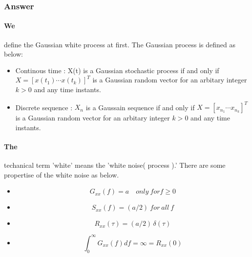 \documentclass[12pt,a4paper]{article}
\begin{document}
	\subsubsection{Answer}
	\paragraph{We} define the Gaussian white process at first. The Gaussian process is defined as below:\\
	\begin{itemize}
		\item Continous time : X(t) is a Gaussian stochastic process if and only if $X=[x(t_{1})\cdots x(t_{k})]^{T}$ is a Gaussian random vector for an arbitary integer $k>0$ and any time instants.
		\item Discrete sequence : $X_{n}$ is a Gaussain sequence if and only if $X=[x_{n_{1}}\cdots x_{n_{k}}]^{T}$ is a Gaussian random vector for an arbitary integer $k>0$ and any time instants.
	\end{itemize}\cite{Book2}
	\paragraph{The}techanical term 'white' means the 'white noise( process ).' There are some propertise of the white noise as below.\cite{Book1}
	\begin{itemize}
		\item 
		\begin{equation}
			G_{xx}(f)=a \quad only\:for f\geq0 
		\end{equation}
		\item 
		\begin{equation}
			S_{xx}(f)=(a/2) \: for \: all \: f
		\end{equation}
		\item 
		\begin{equation}
			R_{xx}(\tau)=(a/2)\,\delta(\tau)
		\end{equation}
		\item 
		\begin{equation}
			\int_{0}^{\infty}G_{xx}(f)df=\infty=R_{xx}(0)
		\end{equation}
	\end{itemize} 
\end{document}
